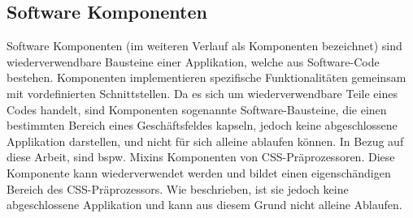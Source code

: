 \subsection{Software Komponenten}
Software Komponenten (im weiteren Verlauf als Komponenten bezeichnet) sind wiederverwendbare Bausteine einer Applikation, welche aus Software-Code bestehen. Komponenten implementieren spezifische Funktionalitäten gemeinsam mit vordefinierten Schnittstellen. Da es sich um wiederverwendbare Teile eines Codes handelt, sind Komponenten sogenannte Software-Bausteine, die einen bestimmten Bereich eines Geschäftsfeldes kapseln, jedoch keine abgeschlossene Applikation darstellen, und nicht für sich alleine ablaufen können. \autocite[1]{Andresen.2003}\newline
In Bezug auf diese Arbeit, sind bspw. Mixins Komponenten von CSS-Präprozessoren. Diese Komponente kann wiederverwendet werden und bildet einen eigenschändigen Bereich des CSS-Präprozessors. Wie beschrieben, ist sie jedoch keine abgeschlossene Applikation und kann aus diesem Grund nicht alleine Ablaufen.

